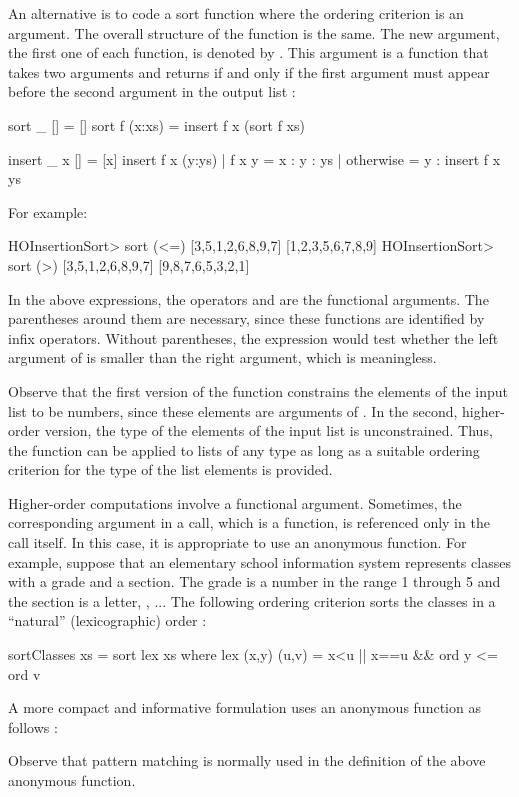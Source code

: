 An alternative is to code a sort function where the ordering
criterion is an argument.
The overall structure of the function is the same.
The new argument, the first one of each function,
is denoted by .
This argument is a function that takes two arguments
and returns  if and only if the first argument
must appear before the second argument in the output list
:\label{HOInsertionSort}
%
\begin{curry}
sort _ []     = []
sort f (x:xs) = insert f x (sort f xs)

insert _ x [] = [x]
insert f x (y:ys) | f x y     = x : y : ys
                  | otherwise = y : insert f x ys
\end{curry}
%
For example:
%
\begin{curry}
HOInsertionSort> sort (<=) [3,5,1,2,6,8,9,7]
[1,2,3,5,6,7,8,9]
HOInsertionSort> sort (>) [3,5,1,2,6,8,9,7]
[9,8,7,6,5,3,2,1]
\end{curry}
%
In the above expressions, 
the operators \ccode{<=} and \ccode{>} are the functional arguments.
The parentheses around them are necessary, since these
functions are identified by infix operators.
Without parentheses, the expression 
would test whether the left argument of \ccode{<=}
is smaller than the right argument, which is meaningless.

Observe that the first version of the  function constrains
the elements of the input list to be numbers,
since these elements are arguments of \ccode{<=}.
In the second, higher-order version, the type 
of the elements of the input list is unconstrained.
Thus, the function can be applied to lists of any type
as long as a suitable ordering criterion
for the type of the list elements is provided.

Higher-order computations involve a functional argument.
Sometimes, the corresponding argument in a call, which is
a function, is referenced only in the call itself.
In this case, it is appropriate to use an anonymous
function.
For example, suppose that an elementary school information
system represents classes with a grade and a section.
The grade is a number in the range 1 through 5 and the
section is a letter, ,  ...
The following ordering criterion sorts the classes
in a  ``natural'' (lexicographic) order
:
%
\begin{curry}
sortClasses xs = sort lex xs
   where lex (x,y) (u,v) = x<u || x==u && ord y <= ord v 
\end{curry}
%
A more compact and informative formulation uses
an anonymous function as follows
:
%
%
Observe that pattern matching is normally used in the definition
of the above anonymous function.

